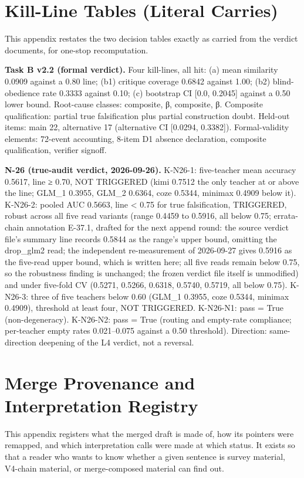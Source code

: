 \documentclass[11pt]{article}
\begin{document}
\section{Kill-Line Tables (Literal Carries)}
\noindent This appendix restates the two decision tables exactly as carried from the verdict documents, for one-stop recomputation.\par
\noindent \textbf{Task B v2.2 (formal verdict).} Four kill-lines, all hit: (a) mean similarity 0.0909 against a 0.80 line; (b1) critique coverage 0.6842 against 1.00; (b2) blind-obedience rate 0.3333 against 0.10; (c) bootstrap CI [0.0, 0.2045] against a 0.50 lower bound. Root-cause classes: composite, β, composite, β. Composite qualification: partial true falsification plus partial construction doubt. Held-out items: main 22, alternative 17 (alternative CI [0.0294, 0.3382]). Formal-validity elements: 72-event accounting, 8-item D1 absence declaration, composite qualification, verifier signoff.\par
\noindent \textbf{N-26 (true-audit verdict, 2026-09-26).} K-N26-1: five-teacher mean accuracy 0.5617, line ≥ 0.70, NOT TRIGGERED (kimi 0.7512 the only teacher at or above the line; GLM\_1 0.3955, GLM\_2 0.6364, coze 0.5344, minimax 0.4909 below it). K-N26-2: pooled AUC 0.5663, line < 0.75 for true falsification, TRIGGERED, robust across all five read variants (range 0.4459 to 0.5916, all below 0.75; errata-chain annotation E-37.1, drafted for the next append round: the source verdict file's summary line records 0.5844 as the range's upper bound, omitting the drop\_glm2 read; the independent re-measurement of 2026-09-27 gives 0.5916 as the five-read upper bound, which is written here; all five reads remain below 0.75, so the robustness finding is unchanged; the frozen verdict file itself is unmodified) and under five-fold CV (0.5271, 0.5266, 0.6318, 0.5740, 0.5719, all below 0.75). K-N26-3: three of five teachers below 0.60 (GLM\_1 0.3955, coze 0.5344, minimax 0.4909), threshold at least four, NOT TRIGGERED. K-N26-N1: pass = True (non-degeneracy). K-N26-N2: pass = True (routing and empty-rate compliance; per-teacher empty rates 0.021–0.075 against a 0.50 threshold). Direction: same-direction deepening of the L4 verdict, not a reversal.\par
\section{Merge Provenance and Interpretation Registry}
\noindent This appendix registers what the merged draft is made of, how its pointers were remapped, and which interpretation calls were made at which status. It exists so that a reader who wants to know whether a given sentence is survey material, V4-chain material, or merge-composed material can find out.\par
\end{document}
